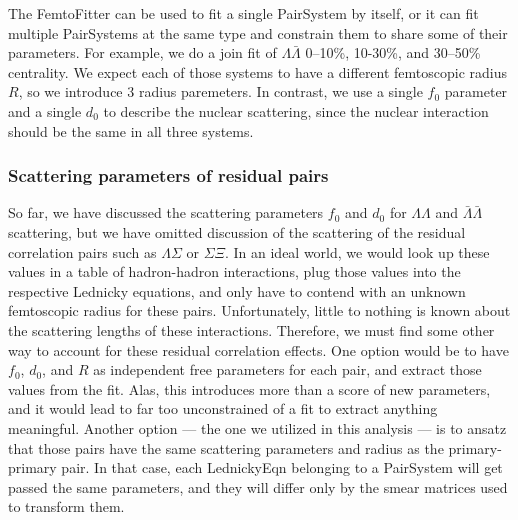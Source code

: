 The FemtoFitter can be used to fit a single PairSystem by itself, or it can fit multiple PairSystems at the same type and constrain them to share some of their parameters.
For example, we do a join fit of $\Lambda\bar{\Lambda}$ 0--10\%, 10-30\%, and 30--50\% centrality.  
We expect each of those systems to have a different femtoscopic radius $R$, so we introduce 3 radius paremeters. 
In contrast, we use a single $f_0$ parameter and a single $d_0$ to describe the nuclear scattering, since the nuclear interaction should be the same in all three systems.


% 




\subsubsection{Scattering parameters of residual pairs}
\label{sec:ScatteringParams}


So far, we have discussed the scattering parameters $f_0$ and $d_0$ for $\Lambda\Lambda$ and $\bar{\Lambda}\bar{\Lambda}$ scattering, but we have omitted discussion of the scattering of the residual correlation pairs such as $\Lambda\Sigma$ or $\Sigma\Xi$.
In an ideal world, we would look up these values in a table of hadron-hadron interactions, plug those values into the respective Lednicky equations, and only have to contend with an unknown femtoscopic radius for these pairs.
Unfortunately, little to nothing is known about the scattering lengths of these interactions.
Therefore, we must find some other way to account for these residual correlation effects.
One option would be to have $f_0$, $d_0$, and $R$ as independent free parameters for each pair, and extract those values from the fit. 
Alas, this introduces more than a score of new parameters, and it would lead to far too unconstrained of a fit to extract anything meaningful.
Another option --- the one we utilized in this analysis --- is to ansatz that those pairs have the same scattering parameters and radius as the primary-primary pair.
In that case, each LednickyEqn belonging to a PairSystem will get passed the same parameters, and they will differ only by the smear matrices used to transform them.


